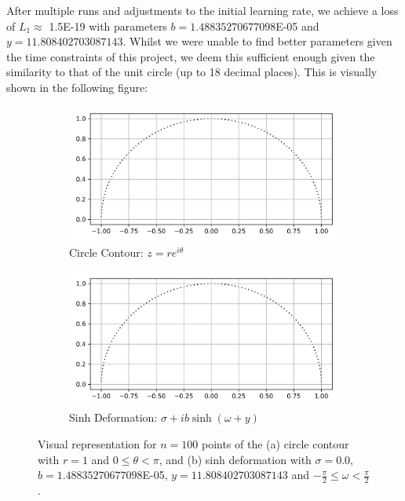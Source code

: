 \documentclass[a4paper]{report}
\begin{document}
After multiple runs and adjustments to the initial learning rate, we achieve a loss of $L_1 \approx$ 1.5E-19 with parameters $b = 1.48835270677098$E-05 and $y = 11.808402703087143$. Whilst we were unable to find better parameters given the time constraints of this project, we deem this sufficient enough given the similarity to that of the unit circle (up to 18 decimal places). This is visually shown in the following figure:
\begin{figure}[H]
    \begin{subfigure}{.5\linewidth}
      \includegraphics[width=\linewidth]{images/gd/unit_circle.png}
      \caption{Circle Contour: $z = re^{i\theta}$}
      \label{fig:circle_contour}
    \end{subfigure}\hfill
    \begin{subfigure}{.5\linewidth}
      \includegraphics[width=\linewidth]{images/gd/best_params.png}
      \caption{Sinh Deformation: $\sigma + ib\sinh(\omega + y)$}
      \label{fig:perfect_sinh}
    \end{subfigure}
    
    \caption{Visual representation for $n = 100$ points of the (a) circle contour with $r = 1$ and $0 \leq \theta < \pi$, and (b) sinh deformation with $\sigma = 0.0$, $b = 1.48835270677098$E-05, $y = 11.808402703087143$ and $-\frac{\pi}{2} \leq \omega < \frac{\pi}{2}$.}
\end{figure}
\end{document}
